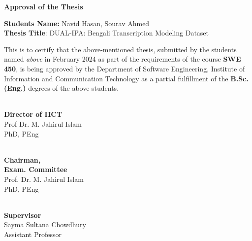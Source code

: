 \newpage
    \begin{center}
        \huge
        \textbf{Approval of the Thesis}\\
        \vspace{1cm}
    \end{center}
    
\begin{FlushLeft}
    \textbf{Students Name:} Navid Hasan, Sourav Ahmed\\
    \textbf{Thesis Title}: DUAL-IPA: Bengali Transcription Modeling Dataset

    \vspace{0.5cm}
    \large
        This is to certify that the above-mentioned thesis, submitted by the students named \textit{above} in February 2024 as part of the requirements of the course \textbf{SWE 450}, is being approved by the Department of Software Engineering, Institute of Information and Communication Technology as a partial fulfillment of the \textbf{B.Sc.(Eng.)} degrees of the above students.\\
  
    \vspace{1.5cm}
    
    \begin{multicols}{3}
				
		\begin{flushleft}
		\hrulefill \\
			{\bf Director of IICT}\\
			Prof Dr. M. Jahirul Islam\\
			PhD, PEng\\
			
		\end{flushleft}
		
		\begin{flushleft}
		\hrulefill \\
			{\bf \hspace{0.5mm}Chairman, \\ Exam. Committee}\\
			Prof. Dr. M. Jahirul Islam\\
			PhD, PEng\\
			
		\end{flushleft}
		
		\begin{flushleft}
		\hrulefill \\
			{\bf \hspace{0.5mm}Supervisor}\\
			Sayma Sultana Chowdhury\\
			Assistant Professor\\
		\end{flushleft}
	\end{multicols}
    

\end{FlushLeft}